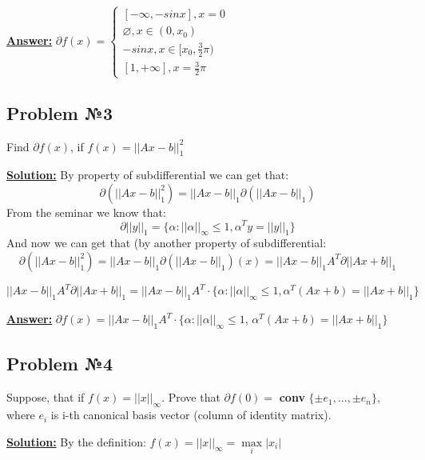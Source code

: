 \underline{\textbf{Answer:}}
$
    \partial f(x) = \begin{cases}
        [-\infty, -sinx], x = 0 \\
        \varnothing, x \in (0, x_0) \\
        -sinx, x \in [x_0, \frac{3}{2} \pi) \\
        [1, +\infty], x = \frac{3}{2} \pi
    \end{cases}
$

\subsection{Problem №3}
Find $\partial f(x)$, if $f(x) = ||Ax - b||_1^2$

\underline{\textbf{Solution:}}
By property of subdifferential we can get 
that:
\begin{equation*}
\partial(||Ax - b||_1^2) = ||Ax - b||_1 \partial(||Ax-b||_1)     
\end{equation*}
From the seminar we know that:
\begin{equation*}
    \partial||y||_1 = \{\alpha : ||\alpha||_{\infty} \leq 1, \alpha^Ty = ||y||_1\}
\end{equation*}
And now we can get that (by another property of subdifferential:
\begin{equation*}
    \partial\left(||Ax - b||_1^2 \right) = ||Ax - b||_1 \partial \left(||Ax-b||_1 \right)(x) = ||Ax - b||_1A^T \partial ||Ax+b||_1
\end{equation*}


\begin{equation*}
 ||Ax - b||_1A^T \partial ||Ax+b||_1 = ||Ax - b||_1A^T \cdot \{\alpha : ||\alpha||_{\infty} \leq 1, \alpha^T (Ax+b ) = ||Ax+b||_1\}
\end{equation*}

\underline{\textbf{Answer:}} $\partial f(x) = ||Ax - b||_1A^T \cdot \{\alpha : ||\alpha||_{\infty} \leq 1$, $\alpha^T (Ax+b ) = ||Ax+b||_1\}$

\subsection{Problem №4}
Suppose, that if $f(x) = ||x||_{\infty}$. Prove that $\partial f(0) = $ \textbf{conv} $\{\pm e_1, ..., \pm e_n \}$, where $e_i$ is i-th canonical basis vector (column of identity matrix).

\underline{\textbf{Solution:}}
By the definition: $f(x) = ||x||_{\infty} = \max\limits_i |x_i|$

